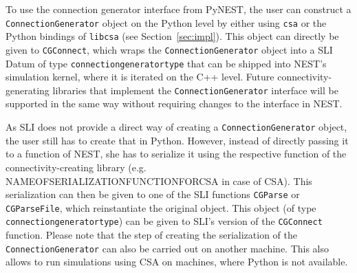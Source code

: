 \documentclass{frontiersSCNS} %
\begin{document}
To use the connection generator interface from PyNEST, the user can
construct a \verb|ConnectionGenerator| object on the Python level by
either using \verb|csa| or the Python bindings of \verb|libcsa| (see
Section~\ref{sec:impl}). This object can directly be given to
\verb|CGConnect|, which wraps the \verb|ConnectionGenerator| object
into a SLI Datum of type \verb|connectiongeneratortype| that can be
shipped into NEST's simulation kernel, where it is iterated on the C++
level. Future connectivity-generating libraries that implement the
\verb|ConnectionGenerator| interface will be supported in the same way
without requiring changes to the interface in NEST.

As SLI does not provide a direct way of creating a
\verb|ConnectionGenerator| object, the user still has to create that
in Python. However, instead of directly passing it to a function of
NEST, she has to serialize it using the respective function of the
connectivity-creating library (e.g. NAMEOFSERIALIZATIONFUNCTIONFORCSA
in case of CSA). This serialization can then be given to one of the
SLI functions \verb|CGParse| or \verb|CGParseFile|, which
reinstantiate the original object. This object (of type
\verb|connectiongeneratortype|) can be given to SLI's version of the
\verb|CGConnect| function. Please note that the step of creating the
serialization of the \verb|ConnectionGenerator| can also be carried
out on another machine. This also allows to run simulations using CSA
on machines, where Python is not available.
\end{document}
